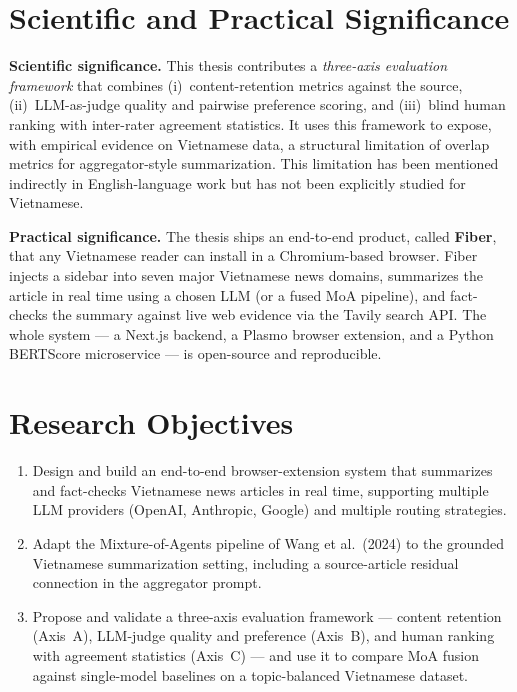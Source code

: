 \section*{Scientific and Practical Significance}

\textbf{Scientific significance.}
This thesis contributes a \textit{three-axis evaluation framework} that
combines (i)~content-retention metrics against the source, (ii)~LLM-as-judge
quality and pairwise preference scoring, and (iii)~blind human ranking with
inter-rater agreement statistics. It uses this framework to expose, with
empirical evidence on Vietnamese data, a structural limitation of overlap
metrics for aggregator-style summarization. This limitation has been mentioned indirectly in English-language work \cite{Wang2024,Zheng2023} but has not been
explicitly studied for Vietnamese.

\textbf{Practical significance.}
The thesis ships an end-to-end product, called \textbf{Fiber}, that any
Vietnamese reader can install in a Chromium-based browser. Fiber injects a
sidebar into seven major Vietnamese news domains, summarizes the article in
real time using a chosen LLM (or a fused MoA pipeline), and fact-checks the
summary against live web evidence via the Tavily search API. The whole
system --- a Next.js backend, a Plasmo browser extension, and a Python
BERTScore microservice --- is open-source and reproducible.

\section*{Research Objectives}

\begin{enumerate}
  \item Design and build an end-to-end browser-extension system that
        summarizes and fact-checks Vietnamese news articles in real time,
        supporting multiple LLM providers (OpenAI, Anthropic, Google) and
        multiple routing strategies.
  \item Adapt the Mixture-of-Agents pipeline of Wang et al.\ (2024) to the
        grounded Vietnamese summarization setting, including a source-article
        residual connection in the aggregator prompt.
  \item Propose and validate a three-axis evaluation framework --- content
        retention (Axis~A), LLM-judge quality and preference (Axis~B), and
        human ranking with agreement statistics (Axis~C) --- and use it to
        compare MoA fusion against single-model baselines on a topic-balanced
        Vietnamese dataset.
\end{enumerate}

